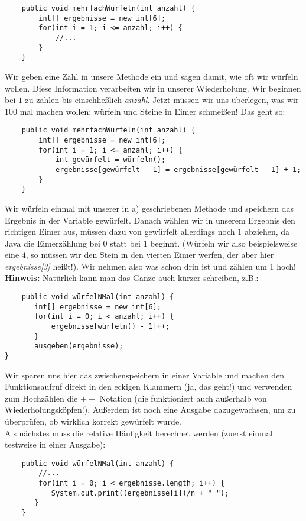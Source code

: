 \documentclass{article}
\begin{document}
\begin{verbatim}
    public void mehrfachWürfeln(int anzahl) {
        int[] ergebnisse = new int[6];
        for(int i = 1; i <= anzahl; i++) {
            //...
        }
    }
\end{verbatim}
Wir geben eine Zahl in unsere Methode ein und sagen damit, wie oft wir würfeln wollen. Diese Information verarbeiten wir in unserer Wiederholung. Wir beginnen bei $1$ zu zählen bis einschließlich \textit{anzahl}. Jetzt müssen wir uns überlegen, was wir 100 mal machen wollen: würfeln und Steine in Eimer schmeißen! Das geht so:
\begin{verbatim}
    public void mehrfachWürfeln(int anzahl) {
        int[] ergebnisse = new int[6];
        for(int i = 1; i <= anzahl; i++) {
            int gewürfelt = würfeln();
            ergebnisse[gewürfelt - 1] = ergebnisse[gewürfelt - 1] + 1;
        }
    }
\end{verbatim}
Wir würfeln einmal mit unserer in a) geschriebenen Methode und speichern das Ergebnis in der Variable gewürfelt. Danach wählen wir in unserem Ergebnis den richtigen Eimer aus, müssen dazu von gewürfelt allerdings noch $1$ abziehen, da Java die Eimerzählung bei $0$ statt bei $1$ beginnt. (Würfeln wir also beispielsweise eine $4$, so müssen wir den Stein in den vierten Eimer werfen, der aber hier \textit{ergebnisse[3]} heißt!). Wir nehmen also was schon drin ist und zählen um 1 hoch! \\
\textbf{Hinweis:} Natürlich kann man das Ganze auch kürzer schreiben, z.B.:
\begin{verbatim}
    public void würfelNMal(int anzahl) {
       int[] ergebnisse = new int[6];
       for(int i = 0; i < anzahl; i++) {
           ergebnisse[würfeln() - 1]++;
       }
       ausgeben(ergebnisse);
}
\end{verbatim}
Wir sparen uns hier das zwischenspeichern in einer Variable und machen den Funktionsaufruf direkt in den eckigen Klammern (ja, das geht!) und verwenden zum Hochzählen die $++$ Notation (die funktioniert auch außerhalb von Wiederholungsköpfen!). Außerdem ist noch eine Ausgabe dazugewachsen, um zu überprüfen, ob wirklich korrekt gewürfelt wurde. \\
Als nächstes muss die relative Häufigkeit berechnet werden (zuerst einmal testweise in einer Ausgabe):
\begin{verbatim}
    public void würfelNMal(int anzahl) {
        //...
        for(int i = 0; i < ergebnisse.length; i++) {
           System.out.print((ergebnisse[i])/n + " ");
       }
    }
\end{verbatim}
\end{document}
